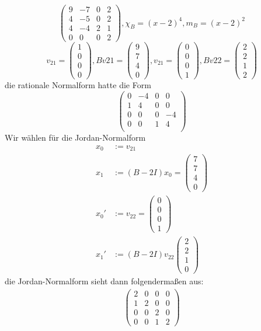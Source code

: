 \documentclass{mycourse}
\begin{document}
\begin{ex}
	\[
		\begin{pmatrix}
			9 & -7 & 0 & 2\\
			4 & -5 & 0 & 2\\
			4 & -4 & 2 & 1\\
			0 & 0 & 0 & 2
		\end{pmatrix}, \chi_B = (x-2)^4, m_B = (x-2)^2
	\]
	\[
	v_{21}=\begin{pmatrix}1\\0\\0\\0\end{pmatrix}, Bv{21} = \begin{pmatrix}9\\7\\4\\0\end{pmatrix}, v_{21}=\begin{pmatrix}0\\0\\0\\1\end{pmatrix}, Bv{22} = \begin{pmatrix}2\\2\\1\\2\end{pmatrix}
	\]
	die rationale Normalform hatte die Form
	\[
		\begin{pmatrix}
			0 & -4 & 0 & 0\\
			1 & 4 & 0 & 0\\
			0 & 0 & 0 & -4\\
			0 & 0 & 1 & 4\\
		\end{pmatrix}
	\]
	Wir wählen für die Jordan-Normalform
	\begin{align*}
		x_0 &:= v_{21}\\
	x_1 &:= (B-2I)x_0 = \begin{pmatrix}7\\7\\4\\0\end{pmatrix}\\
	x_0' &:= v_{22} = \begin{pmatrix}0\\0\\0\\1\end{pmatrix}\\
	x_1' &:= (B-2I)v_{22} \begin{pmatrix}2\\2\\1\\0\end{pmatrix}
	\end{align*}
	die Jordan-Normalform sieht dann folgendermaßen aus:
	\begin{align*}
		\begin{pmatrix}2&0&0&0\\1&2&0&0\\0&0&2&0\\0&0&1&2\end{pmatrix}
	\end{align*}
\end{ex}
\end{document}

